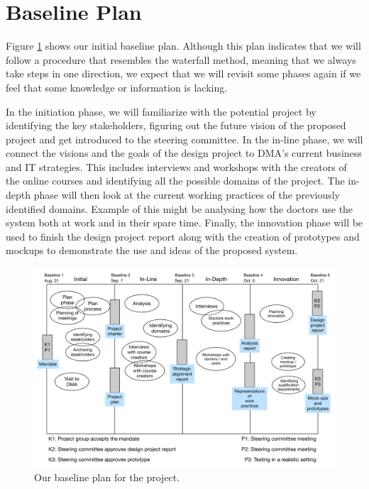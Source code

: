 \section{Baseline Plan}
Figure \ref{baselineplan} shows our initial baseline plan. Although this plan indicates that we will follow a procedure that resembles the waterfall method, meaning that we always take steps in one direction, we expect that we will revisit some phases again if we feel that some knowledge or information is lacking.

In the initiation phase, we will familiarize with the potential project by identifying the key stakeholders, figuring out the future vision of the proposed project and get introduced to the steering committee. In the in-line phase, we will connect the visions and the goals of the design project to DMA’s current business and IT strategies. This includes interviews and workshops with the creators of the online courses and identifying all the possible domains of the project. The in-depth phase will then look at the current working practices of the previously identified domains. Example of this might be analysing how the doctors use the system both at work and in their spare time. Finally, the innovation phase will be used to finish the design project report along with the creation of prototypes and mockups to demonstrate the use and ideas of the proposed system.

\begin{figure}
 \begin{center}
  \includegraphics[width=1\textwidth]{figures/baseline-plan.pdf}
  \caption{Our baseline plan for the project.\label{baselineplan}}
 \end{center}
\end{figure}

